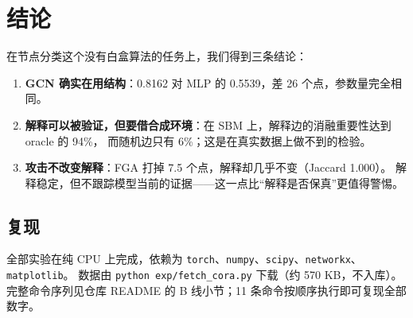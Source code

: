 \documentclass[a4paper,10pt]{article}
\begin{document}
\section{结论}

在节点分类这个没有白盒算法的任务上，我们得到三条结论：

\begin{enumerate}[leftmargin=1.6em]
\item \textbf{GCN 确实在用结构}：0.8162 对 MLP 的 0.5539，差 26 个点，参数量完全相同。
\item \textbf{解释可以被验证，但要借合成环境}：在 SBM 上，解释边的消融重要性达到 oracle 的 94\%，
而随机边只有 6\%；这是在真实数据上做不到的检验。
\item \textbf{攻击不改变解释}：FGA 打掉 7.5 个点，解释却几乎不变（Jaccard 1.000）。
解释稳定，但不跟踪模型当前的证据——这一点比“解释是否保真”更值得警惕。
\end{enumerate}

\subsection*{复现}

全部实验在纯 CPU 上完成，依赖为 \texttt{torch}、\texttt{numpy}、\texttt{scipy}、\texttt{networkx}、\texttt{matplotlib}。
数据由 \texttt{python exp/fetch\_cora.py} 下载（约 570 KB，不入库）。
完整命令序列见仓库 README 的 B 线小节；11 条命令按顺序执行即可复现全部数字。
\end{document}
